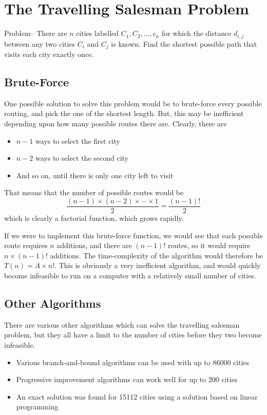 \section*{The Travelling Salesman Problem}

Problem-- There are $n$ cities labelled $C_1, C_2, \ldots, c_n$ for which the distance $d_{i,j}$ between any two cities
 $C_i$ and $C_j$ is known. Find the shortest possible path that visits each city exactly once.

\subsection*{Brute-Force}

One possible solution to solve this problem would be to brute-force every possible routing, and pick the one of the
 shortest length. But, this may be inefficient depending upon how many possible routes there are. Clearly, there are
\begin{itemize}
  \item $n - 1$ ways to select the first city
  \item $n - 2$ ways to select the second city
  \item And so on, until there is only one city left to visit
\end{itemize}

That means that the number of possible routes would be
\begin{equation*}
  \frac{(n-1) \times (n-2) \times \cdots \times 1}{2} = \frac{(n-1)!}{2}
\end{equation*}
which is clearly a factorial function, which grows rapidly.

If we were to implement this brute-force function, we would see that each possible route requires $n$ additions, and
 there are ${(n-1)!}$ routes, so it would require $n \times {(n-1)!}$ additions. The time-complexity of the algorithm
 would therefore be $T(n) = A \times {n!}$. This is obviously a very inefficient algorithm, and would quickly become
 infeasible to run on a computer with a relatively small number of cities.

\subsection*{Other Algorithms}

There are various other algorithms which can solve the travelling salesman problem, but they all have a limit to the
 number of cities before they two become infeasible.
\begin{itemize}
  \item Various branch-and-bound algorithms can be used with up to 86000 cities
  \item Progressive improvement algorithms can work well for up to 200 cities
  \item An exact solution was found for 15112 cities using a solution based on linear programming
\end{itemize}



